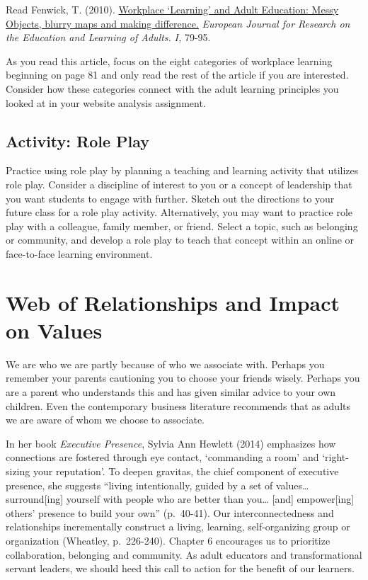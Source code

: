 \documentclass[
]{book}
\begin{document}
\begin{reflect}
Read Fenwick, T. (2010). \href{assets/unit8/Fenwick_2010.pdf}{Workplace
`Learning' and Adult Education: Messy Objects, blurry maps and making
difference.} \emph{European Journal for Research on the Education and
Learning of Adults.} \emph{I,} 79-95.

As you read this article, focus on the eight categories of workplace
learning beginning on page 81 and only read the rest of the article if
you are interested. Consider how these categories connect with the adult
learning principles you looked at in your website analysis assignment.
\end{reflect}

\hypertarget{activity-role-play}{%
\subsection{Activity: Role Play}\label{activity-role-play}}

\begin{reflect}
Practice using role play by planning a teaching and learning activity
that utilizes role play. Consider a discipline of interest to you or a
concept of leadership that you want students to engage with further.
Sketch out the directions to your future class for a role play activity.
Alternatively, you may want to practice role play with a colleague,
family member, or friend. Select a topic, such as belonging or
community, and develop a role play to teach that concept within an
online or face-to-face learning environment.
\end{reflect}

\hypertarget{web-of-relationships-and-impact-on-values}{%
\section{Web of Relationships and Impact on Values}\label{web-of-relationships-and-impact-on-values}}

We are who we are partly because of who we associate with. Perhaps you remember your parents cautioning you to choose your friends wisely.
Perhaps you are a parent who understands this and has given similar advice to your own children. Even the contemporary business literature recommends that as adults we are aware of whom we choose to associate.

In her book \emph{Executive Presence}, Sylvia Ann Hewlett (2014) emphasizes how connections are fostered through eye contact, `commanding a room' and `right-sizing your reputation'. To deepen gravitas, the chief component of executive presence, she suggests ``living intentionally, guided by a set of values\ldots{} surround{[}ing{]} yourself with people who are better than you\ldots{} {[}and{]} empower{[}ing{]} others' presence to build your own'' (p.~40-41). Our interconnectedness and relationships incrementally construct a living, learning, self-organizing group or organization (Wheatley, p.~226-240). Chapter 6 encourages us to prioritize collaboration, belonging and community. As adult educators and transformational servant leaders, we should heed this call to action for the benefit of our learners.
\end{document}
